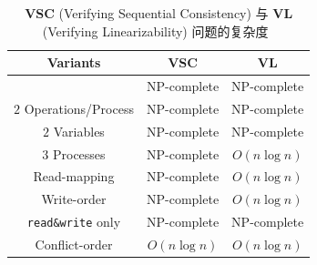 
\begin{frame}{}
\end{frame}

\begin{frame}{}
  \begin{table}[h]
    \centering
    \caption{{\bf VSC} (Verifying Sequential Consistency) 与 {\bf VL} (Verifying Linearizability) 问题的复杂度~}
    \renewcommand\arraystretch{1.2}
      \begin{tabular}{|c|c|c|}
	\hline
	{\bf Variants} & {\bf VSC} & {\bf VL}
	\\ \hline \hline
	\hl{\red{General}} & \textsf{NP}-complete & \textsf{NP}-complete
	\\ \hline
	$2$ Operations/Process & \textsf{NP}-complete & \textsf{NP}-complete
	\\
	$2$ Variables & \textsf{NP}-complete & \textsf{NP}-complete \\
	$3$ Processes & \textsf{NP}-complete & $O(n \log n)$
	\\ \hline
	Read-mapping & \textsf{NP}-complete &  $O(n \log n)$ \\
	Write-order & \textsf{NP}-complete &  $O(n \log n)$ \\
	\texttt{read\&write} only & \textsf{NP}-complete & \textsf{NP}-complete \\
	Conflict-order & $O(n \log n)$ &  $O(n \log n)$
	\\ \hline
      \end{tabular}
  \end{table}
\end{frame}

